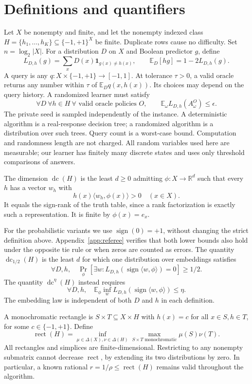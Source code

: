 \documentclass[11pt]{article}
\DeclareMathOperator{\dc}{dc}
\DeclareMathOperator{\sign}{sign}
\DeclareMathOperator{\rect}{rect}
\newcommand{\R}{\mathbb R}
\newcommand{\E}{\mathbb E}
\newcommand{\1}{\mathbf 1}
\begin{document}
\section{Definitions and quantifiers}
Let $X$ be nonempty and finite, and let the nonempty indexed class $H=\{h_1,\ldots,h_K\}\subseteq\{-1,+1\}^X$ be finite. Duplicate rows cause no difficulty. Set $n=\log_2|X|$. For a distribution $D$ on $X$ and Boolean predictor $g$, define
\[
 L_{D,h}(g)=\sum_xD(x)\1_{g(x)\ne h(x)},\qquad
 \E_D[hg]=1-2L_{D,h}(g).
\]
A query is any $q:X\times\{-1,+1\}\to[-1,1]$. At tolerance $\tau>0$, a valid oracle returns any number within $\tau$ of $\E_D q(x,h(x))$. Its choices may depend on the query history. A randomized learner must satisfy
\begin{equation}\label{eq:guarantee}
 \forall D\ \forall h\in H\ \forall\text{ valid oracle policies }O,
 \qquad \E_\omega L_{D,h}(A^O_\omega)\le\epsilon.
\end{equation}
The private seed is sampled independently of the instance. A deterministic algorithm is a real-response decision tree; a randomized algorithm is a distribution over such trees. Query count is a worst-case bound. Computation and randomness length are not charged. All random variables used here are measurable; our learner has finitely many discrete states and uses only threshold comparisons of answers.

The dimension $\dc(H)$ is the least $d\ge0$ admitting $\phi:X\to\R^d$ such that every $h$ has a vector $w_h$ with
\begin{equation}\label{eq:strict}
 h(x)\langle w_h,\phi(x)\rangle>0\quad(x\in X).
\end{equation}
It equals the sign-rank of the truth table, since a rank factorization is exactly such a representation. It is finite by $\phi(x)=e_x$.

For the probabilistic variants we use $\sign(0)=+1$, without changing the strict definition above. Appendix~\ref{app:referee} verifies that both lower bounds also hold under the opposite tie rule or when zeros are counted as errors. The quantity $\dc_{1/2}(H)$ is the least $d$ for which one distribution over embeddings satisfies
\[
 \forall D,h,\quad \Pr_\phi[\exists w:L_{D,h}(\sign\langle w,\phi\rangle)=0]\ge1/2.
\]
The quantity $\dc^\eta(H)$ instead requires
\[
 \forall D,h,\quad \E_\phi\inf_w L_{D,h}(\sign\langle w,\phi\rangle)\le\eta.
\]
The embedding law is independent of both $D$ and $h$ in each definition.

A monochromatic rectangle is $S\times T\subseteq X\times H$ with $h(x)=c$ for all $x\in S,h\in T$, for some $c\in\{-1,+1\}$. Define
\[
 \rect(H)=\inf_{\mu\in\Delta(X),\nu\in\Delta(H)}
       \max_{S\times T\text{ monochromatic}}\mu(S)\nu(T).
\]
All rectangles and simplices are finite-dimensional. Restricting to any nonempty submatrix cannot decrease $\rect$, by extending its two distributions by zero. In particular, a known rational $r=1/\rho\le\rect(H)$ remains valid throughout the algorithm.
\end{document}
